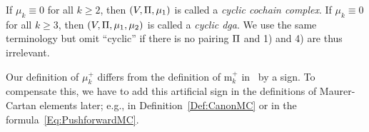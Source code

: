 \documentclass[\MainFolder/Text.tex]{subfiles}
\begin{document}
\begin{Def}
If $\mu_k \equiv 0$ for all $k\ge 2$, then $(V,\Pi, \mu_1)$ is called a \emph{cyclic cochain complex}. If $\mu_k \equiv 0$ for all $k\ge 3$, then $(V,\Pi,\mu_1,\mu_2)$ is called a \emph{cyclic dga}. We use the same terminology but omit ``cyclic'' if there is no pairing $\Pi$ and 1) and 4) are thus irrelevant.
\end{Def}

\begin{Remark}\label{Rem:mukplus}
Our definition of $\mu_k^+$ differs from the definition of $\mathrm{m}_k^+$ in~\cite[Definition 12.1]{Cieliebak2015} by a sign. To compensate this, we have to add this artificial sign in the definitions of Maurer-Cartan elements later; e.g., in Definition~\ref{Def:CanonMC} or in the formula~\eqref{Eq:PushforwardMC}.
\end{Remark}
\end{document}
